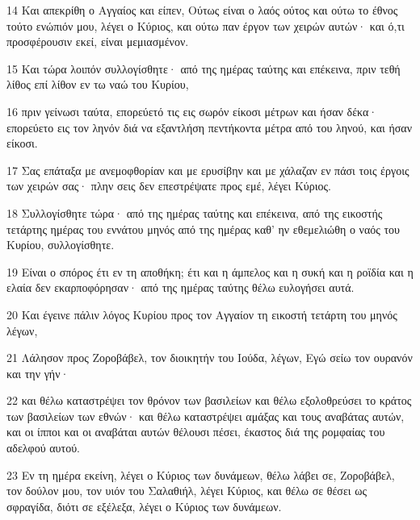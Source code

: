 \par 14 Και απεκρίθη ο Αγγαίος και είπεν, Ούτως είναι ο λαός ούτος και ούτω το έθνος τούτο ενώπιόν μου, λέγει ο Κύριος, και ούτω παν έργον των χειρών αυτών· και ό,τι προσφέρουσιν εκεί, είναι μεμιασμένον.
\par 15 Και τώρα λοιπόν συλλογίσθητε· από της ημέρας ταύτης και επέκεινα, πριν τεθή λίθος επί λίθον εν τω ναώ του Κυρίου,
\par 16 πριν γείνωσι ταύτα, επορεύετό τις εις σωρόν είκοσι μέτρων και ήσαν δέκα· επορεύετο εις τον ληνόν διά να εξαντλήση πεντήκοντα μέτρα από του ληνού, και ήσαν είκοσι.
\par 17 Σας επάταξα με ανεμοφθορίαν και με ερυσίβην και με χάλαζαν εν πάσι τοις έργοις των χειρών σας· πλην σεις δεν επεστρέψατε προς εμέ, λέγει Κύριος.
\par 18 Συλλογίσθητε τώρα· από της ημέρας ταύτης και επέκεινα, από της εικοστής τετάρτης ημέρας του εννάτου μηνός από της ημέρας καθ' ην εθεμελιώθη ο ναός του Κυρίου, συλλογίσθητε.
\par 19 Είναι ο σπόρος έτι εν τη αποθήκη; έτι και η άμπελος και η συκή και η ροϊδία και η ελαία δεν εκαρποφόρησαν· από της ημέρας ταύτης θέλω ευλογήσει αυτά.
\par 20 Και έγεινε πάλιν λόγος Κυρίου προς τον Αγγαίον τη εικοστή τετάρτη του μηνός λέγων,
\par 21 Λάλησον προς Ζοροβάβελ, τον διοικητήν του Ιούδα, λέγων, Εγώ σείω τον ουρανόν και την γήν·
\par 22 και θέλω καταστρέψει τον θρόνον των βασιλείων και θέλω εξολοθρεύσει το κράτος των βασιλείων των εθνών· και θέλω καταστρέψει αμάξας και τους αναβάτας αυτών, και οι ίπποι και οι αναβάται αυτών θέλουσι πέσει, έκαστος διά της ρομφαίας του αδελφού αυτού.
\par 23 Εν τη ημέρα εκείνη, λέγει ο Κύριος των δυνάμεων, θέλω λάβει σε, Ζοροβάβελ, τον δούλον μου, τον υιόν του Σαλαθιήλ, λέγει Κύριος, και θέλω σε θέσει ως σφραγίδα, διότι σε εξέλεξα, λέγει ο Κύριος των δυνάμεων.


